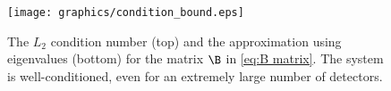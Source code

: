 \begin{figure}
   \centering
   \texttt{[image: graphics/condition\_bound.eps]}  \\
   \caption{The $L_{2}$ condition number (top) and the approximation using eigenvalues (bottom) for the matrix $\B$ in \eqref{eq:B matrix}. The system is well-conditioned, even for an extremely large number of detectors.}
   \label{fig:condition bound}
\end{figure}

\endinput  %